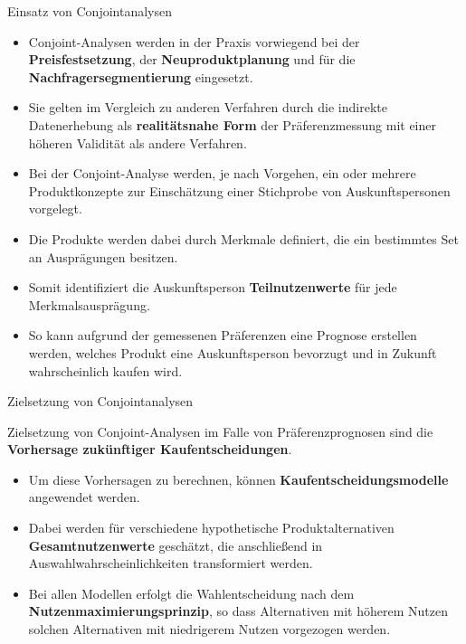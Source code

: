 \documentclass[12pt,ngerman,a4paper,ignorenonframetext,]{beamer}
\providecommand{\tightlist}{%
  \setlength{\itemsep}{0pt}\setlength{\parskip}{0pt}}
\begin{document}
\begin{frame}{Einsatz von Conjointanalysen}
\protect\hypertarget{einsatz-von-conjointanalysen}{}

\begin{itemize}
\item
  Conjoint-Analysen werden in der Praxis vorwiegend bei der
  \textbf{Preisfestsetzung}, der \textbf{Neuproduktplanung} und für die
  \textbf{Nachfragersegmentierung} eingesetzt.
\item
  Sie gelten im Vergleich zu anderen Verfahren durch die indirekte
  Datenerhebung als \textbf{realitätsnahe Form} der Präferenzmessung mit
  einer höheren Validität als andere Verfahren.
\item
  Bei der Conjoint-Analyse werden, je nach Vorgehen, ein oder mehrere
  Produktkonzepte zur Einschätzung einer Stichprobe von
  Auskunftspersonen vorgelegt.
\item
  Die Produkte werden dabei durch Merkmale definiert, die ein bestimmtes
  Set an Ausprägungen besitzen.
\item
  Somit identifiziert die Auskunftsperson \textbf{Teilnutzenwerte} für
  jede Merkmalsausprägung.
\item
  So kann aufgrund der gemessenen Präferenzen eine Prognose erstellen
  werden, welches Produkt eine Auskunftsperson bevorzugt und in Zukunft
  wahrscheinlich kaufen wird.
\end{itemize}

\end{frame}

\begin{frame}{Zielsetzung von Conjointanalysen}
\protect\hypertarget{zielsetzung-von-conjointanalysen}{}

Zielsetzung von Conjoint-Analysen im Falle von Präferenzprognosen sind
die \textbf{Vorhersage zukünftiger Kaufentscheidungen}.

\begin{itemize}
\tightlist
\item
  Um diese Vorhersagen zu berechnen, können
  \textbf{Kaufentscheidungsmodelle} angewendet werden.
\item
  Dabei werden für verschiedene hypothetische Produktalternativen
  \textbf{Gesamtnutzenwerte} geschätzt, die anschließend in
  Auswahlwahrscheinlichkeiten transformiert werden.
\item
  Bei allen Modellen erfolgt die Wahlentscheidung nach dem
  \textbf{Nutzenmaximierungsprinzip}, so dass Alternativen mit höherem
  Nutzen solchen Alternativen mit niedrigerem Nutzen vorgezogen werden.
\end{itemize}

\end{frame}
\end{document}
